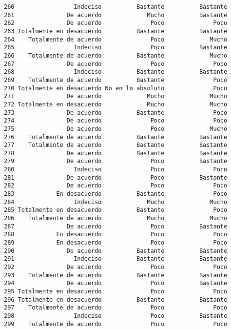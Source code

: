 \documentclass[
  letterpaper,
  DIV=11,
  numbers=noendperiod]{scrartcl}
\begin{document}
\begin{verbatim}
260                 Indeciso          Bastante          Bastante
261               De acuerdo             Mucho          Bastante
262               De acuerdo              Poco              Poco
263 Totalmente en desacuerdo          Bastante          Bastante
264    Totalmente de acuerdo              Poco             Mucho
265                 Indeciso              Poco          Bastante
266    Totalmente de acuerdo          Bastante             Mucho
267               De acuerdo              Poco              Poco
268                 Indeciso          Bastante          Bastante
269    Totalmente de acuerdo          Bastante              Poco
270 Totalmente en desacuerdo No en lo absoluto              Poco
271               De acuerdo             Mucho             Mucho
272 Totalmente en desacuerdo             Mucho             Mucho
273               De acuerdo          Bastante              Poco
274               De acuerdo              Poco              Poco
275               De acuerdo              Poco             Mucho
276    Totalmente de acuerdo          Bastante          Bastante
277    Totalmente de acuerdo          Bastante          Bastante
278               De acuerdo          Bastante          Bastante
279               De acuerdo              Poco          Bastante
280                 Indeciso              Poco              Poco
281               De acuerdo              Poco          Bastante
282               De acuerdo              Poco              Poco
283            En desacuerdo          Bastante              Poco
284                 Indeciso             Mucho             Mucho
285 Totalmente en desacuerdo          Bastante              Poco
286    Totalmente de acuerdo             Mucho             Mucho
287               De acuerdo              Poco          Bastante
288            En desacuerdo              Poco              Poco
289            En desacuerdo              Poco              Poco
290               De acuerdo          Bastante          Bastante
291                 Indeciso          Bastante          Bastante
292               De acuerdo              Poco              Poco
293    Totalmente de acuerdo          Bastante          Bastante
294               De acuerdo              Poco          Bastante
295 Totalmente en desacuerdo              Poco              Poco
296 Totalmente en desacuerdo          Bastante          Bastante
297    Totalmente de acuerdo              Poco              Poco
298                 Indeciso              Poco          Bastante
299    Totalmente de acuerdo              Poco              Poco

\end{verbatim}
\end{document}
